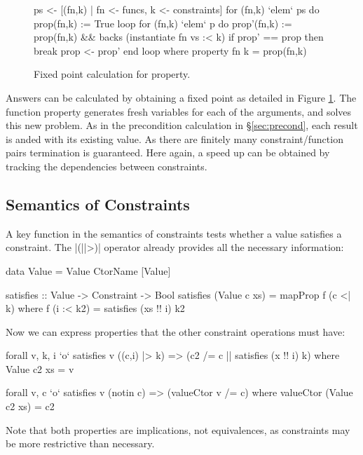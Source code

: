 \documentclass[preprint]{sigplanconf}
\newcommand{\C}[1]{\textsf{#1}}
\newenvironment{discuss}
    {\noindent\hspace{-1.5mm}\vline\hspace{1mm}\vline\hspace{1mm}\begin{minipage}[h]{\linewidth}}
    {\end{minipage}}
\begin{document}
\begin{figure}
\begin{code}
ps <- [(fn,k) | fn <- funcs, k <- constraints]
for (fn,k) `elem` ps do prop(fn,k) := True
loop
    for (fn,k) `elem` p do
        prop'(fn,k) := prop(fn,k) && backs (instantiate fn vs :< k)
    if prop' == prop then break
    prop <- prop'
end loop
    where
        property fn k = prop(fn,k)
\end{code}
\caption{Fixed point calculation for \C{property}.}
\label{fig:property_fixp}
\end{figure}

\begin{discuss}
Answers can be calculated by obtaining a fixed point as detailed in Figure \ref{fig:property_fixp}. The function \C{property} generates fresh variables for each of the arguments, and solves this new problem. As in the precondition calculation in \S\ref{sec:precond}, each result is anded with its existing value. As there are finitely many constraint/function pairs termination is guaranteed. Here again, a speed up can be obtained by tracking the dependencies between constraints.
\end{discuss}

\subsection{Semantics of Constraints}

A key function in the semantics of constraints tests whether a value satisfies a constraint. The |(||>)| operator already provides all the necessary information:

\begin{code}
data Value = Value CtorName [Value]

satisfies :: Value -> Constraint -> Bool
satisfies (Value c xs) = mapProp f (c <| k)
    where f (i :< k2) = satisfies (xs !! i) k2
\end{code}

Now we can express properties that the other constraint operations must have:

\begin{code}
forall v, k, i  `o` satisfies v ((c,i) |> k)
                => (c2 /= c || satisfies (x !! i) k)
    where Value c2 xs = v

forall v, c `o` satisfies v (notin c) => (valueCtor v /= c)
    where valueCtor (Value c2 xs) = c2
\end{code}

\noindent Note that both properties are implications, not equivalences, as constraints may be more restrictive than necessary.
\end{document}
